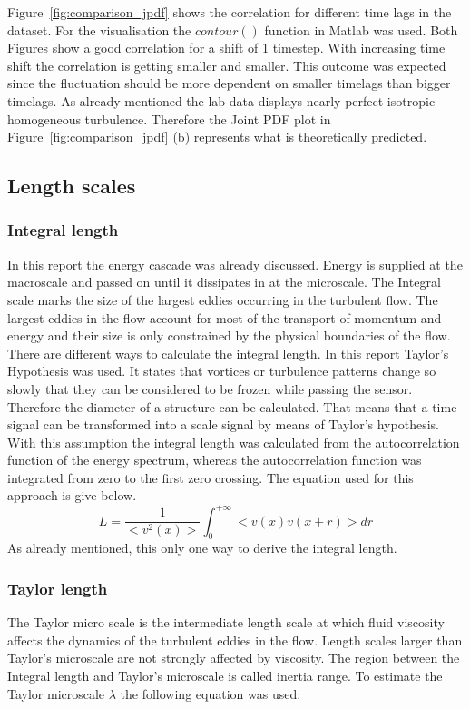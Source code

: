 \documentclass[12pt]{article}
\begin{document}
Figure~\ref{fig:comparison_jpdf} shows the correlation for different time lags in the dataset. For the visualisation the $contour()$ function in Matlab was used. Both Figures show a good correlation for a shift of 1 timestep. With increasing time shift the correlation is getting smaller and smaller. This outcome was expected since the fluctuation should be more dependent on smaller timelags than bigger timelags. As already mentioned the lab data displays nearly perfect isotropic homogeneous turbulence. Therefore the Joint PDF plot in Figure~\ref{fig:comparison_jpdf} (b) represents what is theoretically predicted.
\subsection{Length scales}
\subsubsection{Integral length}
In this report the energy cascade was already discussed. Energy is supplied at the macroscale and passed on until it dissipates in at the microscale. The Integral scale marks the size of the largest eddies occurring in the turbulent flow. The largest eddies in the flow account for most of the transport of momentum and energy and their size is only constrained by the physical boundaries of the flow. There are different ways to calculate the integral length. In this report Taylor's Hypothesis was used. It states that vortices or turbulence patterns change so slowly that they can be considered to be frozen while passing the sensor. Therefore the diameter of a structure can be calculated. That means that a time signal can be transformed into a scale signal by means of Taylor's hypothesis. \cite{tutorial} With this assumption the integral length was calculated from the autocorrelation function of the energy spectrum, whereas the autocorrelation function was integrated from zero to the first zero crossing. The equation used for this approach is give below.
\begin{equation}
L = \frac{1}{<v^2(x)>}\int_{0}^{+\infty}<v(x)v(x+r)>dr
\end{equation}
As already mentioned, this only one way to derive the integral length. 
\subsubsection{Taylor length}
The Taylor micro scale is the intermediate length scale at which fluid viscosity affects the dynamics of the turbulent eddies in the flow. Length scales larger than Taylor's microscale are not strongly affected by viscosity. The region between the Integral length and Taylor's microscale is called inertia range. To estimate the Taylor microscale $\lambda$ the following equation was used:
\end{document}
